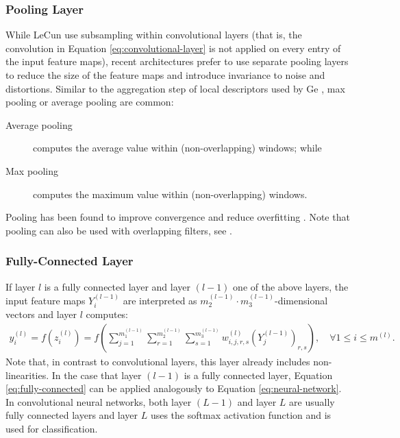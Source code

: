\subsubsection{Pooling Layer}
\label{subsubsec:pooling-layer}

While LeCun \etal \cite{LeCunBoserDenkerhendersonHowardHubbardJackel:1989} use subsampling within convolutional layers (that is, the convolution in Equation \eqref{eq:convolutional-layer} is not applied on every entry of the input feature maps), recent architectures prefer to use separate pooling layers to reduce the size of the feature maps and introduce invariance to noise and distortions. Similar to the aggregation step of local descriptors used by Ge \etal \cite{GeKeSun:2013}, max pooling or average pooling are common:
\vspace{-6px}
\begin{description}
	\item[Average pooling] computes the average value within (non-overlapping) windows; while
	\vspace{-14px}
	\item[Max pooling] computes the maximum value within (non-overlapping) windows.
\end{description}
\vspace{-6px}
Pooling has been found to improve convergence and reduce overfitting \cite{KrizhevskySutskeverHinton:2012}. Note that pooling can also be used with overlapping filters, see \cite{KrizhevskySutskeverHinton:2012}.

\subsubsection{Fully-Connected Layer}
\label{subsubsec:fully-connected}

If layer $l$ is a fully connected layer and layer $(l - 1)$ one of the above layers, the input feature maps $Y_i^{(l-1)}$ are interpreted as $m_2^{(l-1)} \cdot m_3^{(l-1)}$-dimensional vectors and layer $l$ computes:
\begin{align}
    y_i^{(l)} = f\left(z_i^{(l)}\right) = f\left(\sum_{j = 1}^{m_1^{(l-1)}} \sum_{r = 1}^{m_2^{(l-1)}} \sum_{s = 1}^{m_3^{(l-1)}} w_{i,j,r,s}^{(l)} \left(Y_j^{(l-1)}\right)_{r,s}\right),\quad \forall 1 \leq i \leq m^{(l)}\label{eq:fully-connected}.
\end{align}
Note that, in contrast to convolutional layers, this layer already includes non-linearities. In the case that layer $(l-1)$ is a fully connected layer, Equation \eqref{eq:fully-connected} can be applied analogously to Equation \eqref{eq:neural-network}.
In convolutional neural networks, both layer $(L - 1)$ and layer $L$ are usually fully connected layers and layer $L$ uses the softmax activation function and is used for classification.

